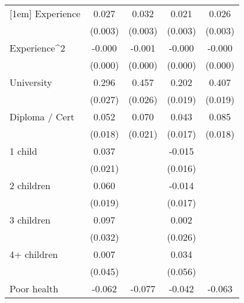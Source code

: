 {\begin{tabular}{l*{4}{c}}
[1em]
Experience          &       0.027\sym{***}&       0.032\sym{***}&       0.021\sym{***}&       0.026\sym{***}\\
                    &     (0.003)         &     (0.003)         &     (0.003)         &     (0.003)         \\
[1em]
Experience^{2}      &      -0.000\sym{***}&      -0.001\sym{***}&      -0.000\sym{***}&      -0.000\sym{***}\\
                    &     (0.000)         &     (0.000)         &     (0.000)         &     (0.000)         \\
[1em]
University          &       0.296\sym{***}&       0.457\sym{***}&       0.202\sym{***}&       0.407\sym{***}\\
                    &     (0.027)         &     (0.026)         &     (0.019)         &     (0.019)         \\
[1em]
Diploma / Cert      &       0.052\sym{**} &       0.070\sym{***}&       0.043\sym{*}  &       0.085\sym{***}\\
                    &     (0.018)         &     (0.021)         &     (0.017)         &     (0.018)         \\
[1em]
1 child             &       0.037         &                     &      -0.015         &                     \\
                    &     (0.021)         &                     &     (0.016)         &                     \\
[1em]
2 children          &       0.060\sym{**} &                     &      -0.014         &                     \\
                    &     (0.019)         &                     &     (0.017)         &                     \\
[1em]
3 children          &       0.097\sym{**} &                     &       0.002         &                     \\
                    &     (0.032)         &                     &     (0.026)         &                     \\
[1em]
4+ children         &       0.007         &                     &       0.034         &                     \\
                    &     (0.045)         &                     &     (0.056)         &                     \\
[1em]
Poor health         &      -0.062\sym{***}&      -0.077\sym{***}&      -0.042\sym{**} &      -0.063\sym{***}\\

\end{tabular}}
